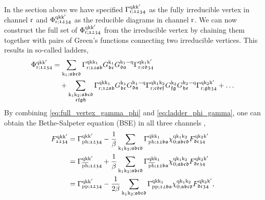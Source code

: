 \documentclass[../../main.tex]{subfiles}
\begin{document}
In the section above we have specified $\Gamma_{\text{r};\mathfrak{1234}}^{\text{q}\text{k}\text{k}'}$ as the fully irreducible vertex in channel $\text{r}$ and $\Phi_{\text{r};\mathfrak{1234}}^{\text{q}\text{k}\text{k}'}$	as the reducible diagrams in channel $\text{r}$. We can now construct the full set of $\Phi_{\text{r};\mathfrak{1234}}^{\text{q}\text{k}\text{k}'}$ from the irreducible vertex by chaining them together with pairs of Green's functions connecting two irreducible vertices. This results in so-called ladders, 
\begin{align}\label{eq:ladder_phi_gamma}
\begin{split}
	\Phi_{\text{r};\mathfrak{1234}}^{\text{q}\text{k}\text{k}'}&=\sum_{\text{k}_1;\mathfrak{abcd}} \Gamma_{\text{r};\mathfrak{12ab}}^{\text{q}\text{k}\text{k}_1} G_{\mathfrak{bc}}^{\text{k}_1} G_{\mathfrak{da}}^{\text{k}_1-\text{q}} \Gamma_{\text{r};\mathfrak{cd34}}^{\text{q}\text{k}_1\text{k}'}\\
	&\quad+\sum_{\substack{\text{k}_1\text{k}_2;\mathfrak{abcd}\\\mathfrak{efgh}}} \Gamma_{\text{r};\mathfrak{12ab}}^{\text{q}\text{k}\text{k}_1} G_{\mathfrak{bc}}^{\text{k}_1} G_{\mathfrak{da}}^{\text{k}_1-\text{q}} \Gamma_{\text{r};\mathfrak{cdef}}^{\text{q}\text{k}_1\text{k}_2} G_{\mathfrak{fg}}^{\text{k}_2} G_{\mathfrak{he}}^{\text{k}_2-\text{q}} \Gamma_{\text{r};\mathfrak{gh34}}^{\text{q}\text{k}_2\text{k}'} + \dots
\end{split}
\end{align}
By combining \eqref{eq:full_vertex_gamma_phi} and \eqref{eq:ladder_phi_gamma}, one can obtain the Bethe-Salpeter equation (BSE) in all three channels \cite{a relativistic equation for bound-state, nambu paper, rohringer thesis maybe},
\begin{subequations}\label{eq:bethe_salpeter_vertex_three_channels}
\begin{align}
	F_{\mathfrak{1234}}^{\text{q}\text{k}\text{k}'}&=\Gamma_{\text{ph};\mathfrak{1234}}^{\text{q}\text{k}\text{k}'}-\frac1\beta\sum_{\text{k}_1\text{k}_2;\mathfrak{abcd}} \Gamma_{\text{ph};\mathfrak{12ba}}^{\text{q}\text{k}\text{k}_1} \chi_{0;\mathfrak{abcd}}^{\text{q}\text{k}_1\text{k}_2} F_{\mathfrak{dc34}}^{\text{q}\text{k}_2\text{k}'}\\
	&=\Gamma_{\overline{\text{ph}};\mathfrak{1234}}^{\text{q}\text{k}\text{k}'}+\frac1\beta\sum_{\text{k}_1\text{k}_2;\mathfrak{abcd}} \Gamma_{\overline{\text{ph}};\mathfrak{12ba}}^{\text{q}\text{k}\text{k}_1} \chi_{0;\mathfrak{abcd}}^{\text{q}\text{k}_1\text{k}_2} F_{\mathfrak{dc34}}^{\text{q}\text{k}_2\text{k}'}\\
	&=\Gamma_{\text{pp};\mathfrak{1234}}^{\text{q}\text{k}\text{k}'}-\frac{1}{2\beta}\sum_{\text{k}_1\text{k}_2;\mathfrak{abcd}} \Gamma_{\text{pp};\mathfrak{12ba}}^{\text{q}\text{k}\text{k}_1} \chi_{0;\mathfrak{abcd}}^{\text{q}\text{k}_1\text{k}_2} F_{\mathfrak{dc34}}^{\text{q}\text{k}_2\text{k}'},
\end{align}
\end{subequations}
\end{document}

